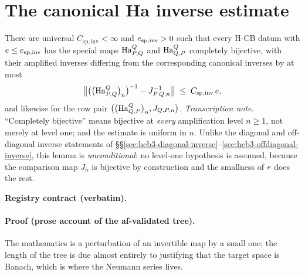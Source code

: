 \section{The canonical Ha inverse estimate}\label{sec:hcb4-canonical-inverse}

\begin{lemma}\label{lem:hcb4-canonical-inverse}
There are universal $C_{\mathrm{sp,inv}}<\infty$ and $e_{\mathrm{sp,inv}}>0$ such that
every H-CB datum with $e\le e_{\mathrm{sp,inv}}$ has the special maps
$\mathrm{Ha}^{Q}_{P,Q}$ and $\mathrm{Ha}^{Q}_{Q,P}$ completely bijective, with their amplified inverses
differing from the corresponding canonical inverses by at most
\begin{equation}\label{eq:ci-main}
  \bigl\lVert\bigl(\bigl(\mathrm{Ha}^{Q}_{P,Q}\bigr)_{n}\bigr)^{-1}-J_{P,Q,n}^{-1}\bigr\rVert
  \;\le\;C_{\mathrm{sp,inv}}\,e ,
\end{equation}
and likewise for the row pair $\bigl(\bigl(\mathrm{Ha}^{Q}_{Q,P}\bigr)_{n},J_{Q,P,n}\bigr)$.
\emph{Transcription note.} ``Completely bijective'' means bijective at \emph{every}
amplification level $n\ge1$, not merely at level one; and the estimate is uniform in $n$.
Unlike the diagonal and off-diagonal inverse statements of
\S\S\ref{sec:hcb3-diagonal-inverse}--\ref{sec:hcb3-offdiagonal-inverse}, this lemma is
\emph{unconditional}: no level-one hypothesis is assumed, because the comparison map
$J_n$ is bijective by construction and the smallness of $e$ does the rest.
\end{lemma}

\noindent\textbf{Registry contract (verbatim).}

\paragraph{Proof (prose account of the af-validated tree).}
The mathematics is a perturbation of an invertible map by a small one; the length of the
tree is due almost entirely to justifying that the target space is Banach, which is where
the Neumann series lives.


